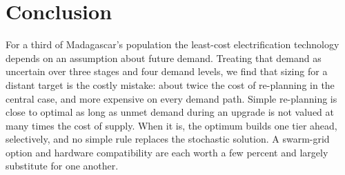 \documentclass[11pt,a4paper]{article}
\begin{document}
\section{Conclusion}
For a third of Madagascar's population the least-cost electrification technology depends on an assumption about
future demand. Treating that demand as uncertain over three stages and four demand levels, we find that sizing for
a distant target is the costly mistake: about twice the cost of re-planning in the central case, and more
expensive on every demand path. Simple re-planning is close to optimal as long as unmet demand during an upgrade
is not valued at many times the cost of supply. When it is, the optimum builds one tier ahead, selectively, and no
simple rule replaces the stochastic solution. A swarm-grid option and hardware compatibility are each worth a few
percent and largely substitute for one another.



\end{document}
